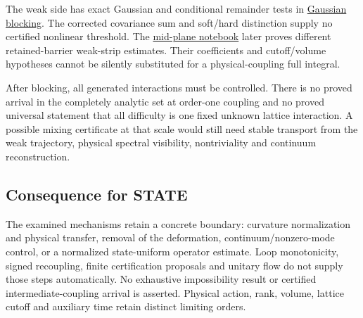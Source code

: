 \documentclass[11pt,a4paper]{article}
\begin{document}
The weak side has exact Gaussian and conditional remainder tests in
\href{small-field-step-gaussian.md}{Gaussian blocking}. The corrected
covariance sum and soft/hard distinction supply no certified nonlinear
threshold. The \href{su2-midplane-small-field.md}{mid-plane notebook}
later proves different retained-barrier weak-strip estimates. Their
coefficients and cutoff/volume hypotheses cannot be silently substituted
for a physical-coupling full integral.

After blocking, all generated interactions must be controlled. There is
no proved arrival in the completely analytic set at order-one coupling
and no proved universal statement that all difficulty is one fixed
unknown lattice interaction. A possible mixing certificate at that scale
would still need stable transport from the weak trajectory, physical
spectral visibility, nontriviality and continuum reconstruction.

\hypertarget{consequence-for-state}{%
\subsection{Consequence for STATE}\label{consequence-for-state}}

The examined mechanisms retain a concrete boundary: curvature
normalization and physical transfer, removal of the deformation,
continuum/nonzero-mode control, or a normalized state-uniform operator
estimate. Loop monotonicity, signed recoupling, finite certification
proposals and unitary flow do not supply those steps automatically. No
exhaustive impossibility result or certified intermediate-coupling
arrival is asserted. Physical action, rank, volume, lattice cutoff and
auxiliary time retain distinct limiting orders.
\end{document}
